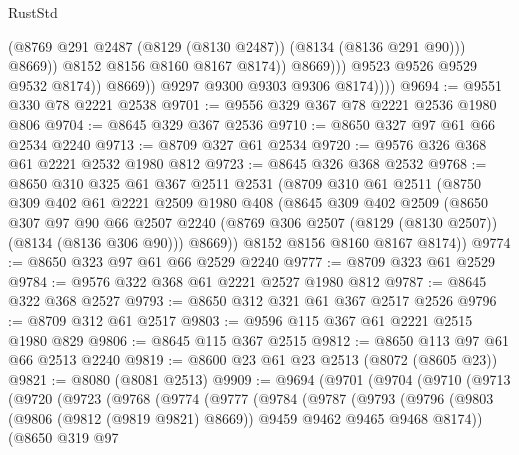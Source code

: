 \begin{lexlean}{RustStd}
\begin{coremodule}
                                  (@8769 @291 @2487 (@8129 (@8130 @2487)) (@8134 (@8136 @291 @90)))
                                  @8669))
                              @8152
                              @8156
                              @8160
                              @8167
                              @8174))
                          @8669)))
                    @9523
                    @9526
                    @9529
                    @9532
                    @8174))
                @8669))
            @9297
            @9300
            @9303
            @9306
            @8174))))
@9694 := @9551 @330 @78 @2221 @2538
@9701 := @9556 @329 @367 @78 @2221 @2536 @1980 @806
@9704 := @8645 @329 @367 @2536
@9710 := @8650 @327 @97 @61 @66 @2534 @2240
@9713 := @8709 @327 @61 @2534
@9720 := @9576 @326 @368 @61 @2221 @2532 @1980 @812
@9723 := @8645 @326 @368 @2532
@9768 := @8650
    @310
    @325
    @61
    @367
    @2511
    @2531
    (@8709
      @310
      @61
      @2511
      (@8750
        @309
        @402
        @61
        @2221
        @2509
        @1980
        @408
        (@8645
          @309
          @402
          @2509
          (@8650
            @307
            @97
            @90
            @66
            @2507
            @2240
            (@8769 @306 @2507 (@8129 (@8130 @2507)) (@8134 (@8136 @306 @90)))
            @8669))
        @8152
        @8156
        @8160
        @8167
        @8174))
@9774 := @8650 @323 @97 @61 @66 @2529 @2240
@9777 := @8709 @323 @61 @2529
@9784 := @9576 @322 @368 @61 @2221 @2527 @1980 @812
@9787 := @8645 @322 @368 @2527
@9793 := @8650 @312 @321 @61 @367 @2517 @2526
@9796 := @8709 @312 @61 @2517
@9803 := @9596 @115 @367 @61 @2221 @2515 @1980 @829
@9806 := @8645 @115 @367 @2515
@9812 := @8650 @113 @97 @61 @66 @2513 @2240
@9819 := @8600 @23 @61 @23 @2513 (@8072 (@8605 @23))
@9821 := @8080 (@8081 @2513)
@9909 := @9694
    (@9701
      (@9704
        (@9710
          (@9713
            (@9720
              (@9723
                (@9768
                  (@9774
                    (@9777
                      (@9784
                        (@9787
                          (@9793
                            (@9796
                              (@9803
                                (@9806 (@9812 (@9819 @9821) @8669))
                                @9459
                                @9462
                                @9465
                                @9468
                                @8174))
                            (@8650
                              @319
                              @97

\end{coremodule}
\end{lexlean}
